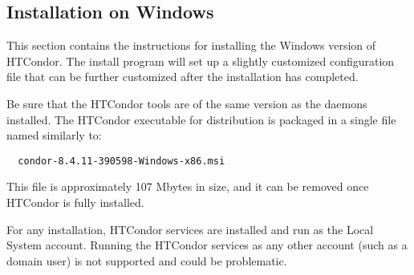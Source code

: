 \subsection{\label{sec:Windows-Install}Installation on Windows}

This section contains the instructions for 
installing the Windows version of HTCondor.  
The install program will set up a slightly customized configuration
file that can be further customized after the installation has completed.


Be sure that the HTCondor tools are of the same version
as the daemons installed.
The HTCondor executable for distribution is packaged in
a single file named similarly to:
\begin{verbatim}
  condor-8.4.11-390598-Windows-x86.msi
\end{verbatim}
This file is approximately 107 Mbytes in size, and it can be
removed once HTCondor is fully installed.



For any installation, HTCondor services are installed and run as the
Local System account.
Running the HTCondor services as any other account (such as a domain user) 
is not supported and could be problematic.
 
